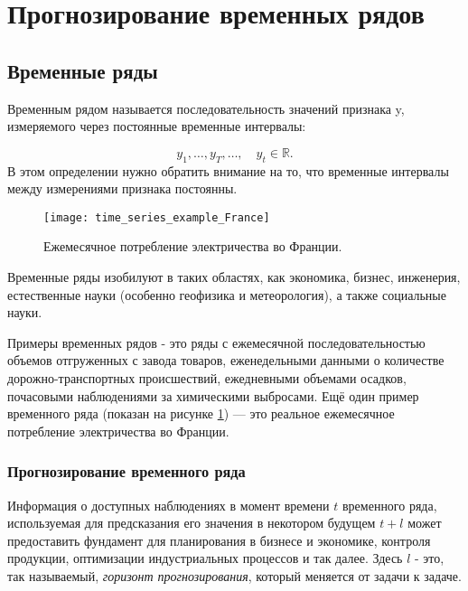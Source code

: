 \section{Прогнозирование временных рядов}

\subsection{Временные ряды}

Временным рядом называется последовательность значений признака y, измеряемого 
через постоянные временные интервалы:

\begin{equation*}
    y_1, \dots, y_T, \dots, \quad y_t \in \mathbb{R}.
\end{equation*}
В этом определении нужно обратить внимание на то, что временные интервалы между 
измерениями признака постоянны.\\[-0.5em]

\begin{figure}[h!]
    \centering
    \texttt{[image: time\_series\_example\_France]}
    \caption{Ежемесячное потребление электричества во Франции. 
    }
    \label{fig:time_series_example_France}
\end{figure}

Временные ряды изобилуют в таких
областях, как экономика, бизнес, инженерия, естественные науки 
(особенно геофизика и метеорология), а также социальные науки.

Примеры временных рядов - это ряды с  
ежемесячной последовательностью объемов отгруженных с завода товаров, 
еженедельными данными о количестве дорожно-транспортных происшествий, 
ежедневными объемами осадков, почасовыми наблюдениями за химическими 
выбросами. Ещё один пример временного ряда 
(показан на рисунке \ref{fig:time_series_example_France}) — это реальное 
ежемесячное потребление электричества во Франции.

\subsubsection{Прогнозирование временного ряда}

Информация о доступных наблюдениях в момент времени $t$ временного ряда, 
используемая для предсказания его значения в некотором будущем $t+l$ может 
предоставить фундамент для планирования в бизнесе и экономике, контроля продукции, 
оптимизации индустриальных процессов и так далее. Здесь $l$ - это, так называемый, 
\textit{горизонт прогнозирования}, который меняется от задачи к задаче.

